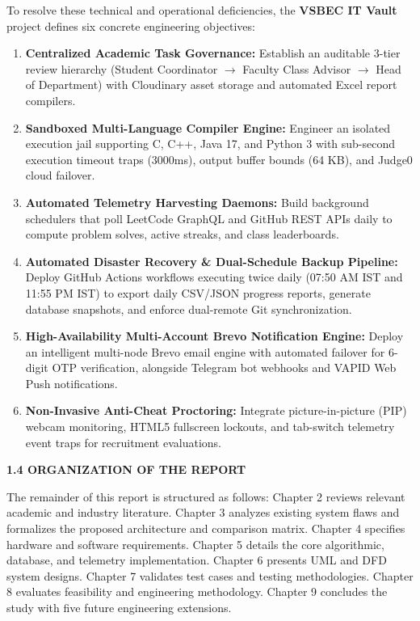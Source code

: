 {To resolve these technical and operational deficiencies, the \textbf{VSBEC IT Vault} project defines six concrete engineering objectives:
\begin{enumerate}[noitemsep,topsep=2pt,leftmargin=*]
  \item \textbf{Centralized Academic Task Governance:} Establish an auditable 3-tier review hierarchy (Student Coordinator $\rightarrow$ Faculty Class Advisor $\rightarrow$ Head of Department) with Cloudinary asset storage and automated Excel report compilers.
  \item \textbf{Sandboxed Multi-Language Compiler Engine:} Engineer an isolated execution jail supporting C, C++, Java 17, and Python 3 with sub-second execution timeout traps (3000ms), output buffer bounds (64 KB), and Judge0 cloud failover.
  \item \textbf{Automated Telemetry Harvesting Daemons:} Build background schedulers that poll LeetCode GraphQL and GitHub REST APIs daily to compute problem solves, active streaks, and class leaderboards.
  \item \textbf{Automated Disaster Recovery \& Dual-Schedule Backup Pipeline:} Deploy GitHub Actions workflows executing twice daily (07:50 AM IST and 11:55 PM IST) to export daily CSV/JSON progress reports, generate database snapshots, and enforce dual-remote Git synchronization.
  \item \textbf{High-Availability Multi-Account Brevo Notification Engine:} Deploy an intelligent multi-node Brevo email engine with automated failover for 6-digit OTP verification, alongside Telegram bot webhooks and VAPID Web Push notifications.
  \item \textbf{Non-Invasive Anti-Cheat Proctoring:} Integrate picture-in-picture (PIP) webcam monitoring, HTML5 fullscreen lockouts, and tab-switch telemetry event traps for recruitment evaluations.
\end{enumerate}

\vspace{0.4cm}
{\fontsize{14pt}{18pt}\selectfont\bfseries 1.4 ORGANIZATION OF THE REPORT\par}
\vspace{0.3cm}

The remainder of this report is structured as follows: Chapter 2 reviews relevant academic and industry literature. Chapter 3 analyzes existing system flaws and formalizes the proposed architecture and comparison matrix. Chapter 4 specifies hardware and software requirements. Chapter 5 details the core algorithmic, database, and telemetry implementation. Chapter 6 presents UML and DFD system designs. Chapter 7 validates test cases and testing methodologies. Chapter 8 evaluates feasibility and engineering methodology. Chapter 9 concludes the study with five future engineering extensions.\par}
\newpage
